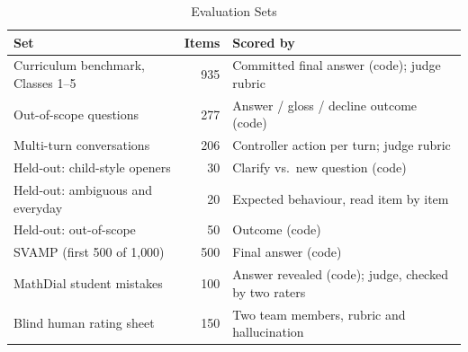 \begin{table}[t]
\centering
\caption{Evaluation Sets}
\label{tab:evalsets}
\footnotesize
\begin{tabular}{@{}L{3.0cm}rL{3.6cm}@{}}
\toprule
Set & Items & Scored by \\
\midrule
Curriculum benchmark, Classes 1--5 & 935 & Committed final answer (code); judge rubric \\
Out-of-scope questions & 277 & Answer / gloss / decline outcome (code) \\
Multi-turn conversations & 206 & Controller action per turn; judge rubric \\
Held-out: child-style openers & 30 & Clarify vs.\ new question (code) \\
Held-out: ambiguous and everyday & 20 & Expected behaviour, read item by item \\
Held-out: out-of-scope & 50 & Outcome (code) \\
SVAMP (first 500 of 1{,}000) & 500 & Final answer (code) \\
MathDial student mistakes & 100 & Answer revealed (code); judge, checked by two raters \\
Blind human rating sheet & 150 & Two team members, rubric and hallucination \\
\bottomrule
\end{tabular}
\end{table}
